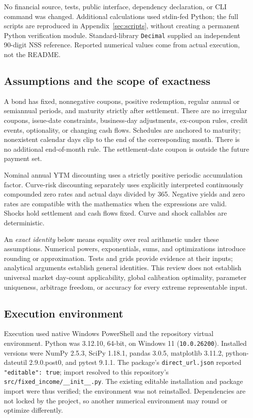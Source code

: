 \documentclass[12pt,a4paper]{article}
\begin{document}
No financial source, tests, public interface, dependency declaration, or
CLI command was changed. Additional calculations used stdin-fed Python;
the full scripts are reproduced in Appendix~\ref{sec:scripts}, without
creating a permanent Python verification module. Standard-library
\texttt{Decimal} supplied an independent 90-digit NSS reference.
Reported numerical values come from actual execution, not the README.

\subsection{Assumptions and the scope of exactness}
A bond has fixed, nonnegative coupons, positive redemption, regular annual
or semiannual periods, and maturity strictly after settlement.
There are no irregular coupons, issue-date constraints, business-day
adjustments, ex-coupon rules, credit events, optionality, or changing cash
flows. Schedules are anchored to maturity; nonexistent calendar days clip
to the end of the corresponding month. There is no additional end-of-month
rule. The settlement-date coupon is outside the future payment set.

Nominal annual YTM discounting uses a strictly positive periodic
accumulation factor. Curve-risk discounting separately uses explicitly
interpreted continuously compounded zero rates and actual days divided by
365. Negative yields and zero rates are compatible with the mathematics
when the expressions are valid. Shocks hold settlement and cash flows fixed.
Curve and shock callables are deterministic.

An \emph{exact identity} below means equality over real arithmetic under these
assumptions. Numerical powers, exponentials, sums, and optimizations introduce
rounding or approximation. Tests and grids provide evidence at their inputs;
analytical arguments establish general identities. This review does not
establish universal market day-count applicability, global calibration
optimality, parameter uniqueness, arbitrage freedom, or accuracy for every
extreme representable input.

\subsection{Execution environment}
Execution used native Windows PowerShell and the repository virtual environment.
Python was 3.12.10, 64-bit, on Windows 11
(\texttt{10.0.26200}). Installed versions were NumPy 2.5.3,
SciPy 1.18.1, pandas 3.0.5, matplotlib 3.11.2,
python-dateutil 2.9.0.post0, and pytest 9.1.1.
The package's \texttt{direct\_url.json} reported
\texttt{"editable": true}; import resolved to this repository's
\texttt{src/fixed\_income/\_\_init\_\_.py}.
The existing editable installation and package import were thus verified;
the environment was not reinstalled. Dependencies are not locked by the
project, so another numerical environment may round or optimize differently.
\end{document}
